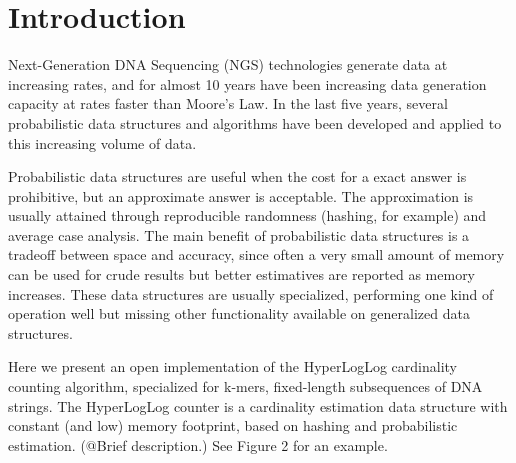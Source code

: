 \documentclass{bioinfo}
\begin{document}

\section{Introduction}

Next-Generation DNA Sequencing (NGS) technologies generate data at
increasing rates, and for almost 10 years have been increasing data
generation capacity at rates faster than Moore's Law.  In the last
five years, several probabilistic data structures and algorithms have
been developed and applied to this increasing volume of data.

Probabilistic data structures are useful when the cost for a exact
answer is prohibitive, but an approximate answer is acceptable.  The
approximation is usually attained through reproducible randomness
(hashing, for example) and average case analysis.  The main benefit of
probabilistic data structures is a tradeoff between space and
accuracy, since often a very small amount of memory can be used for
crude results but better estimatives are reported as memory increases.
These data structures are usually specialized, performing one kind of
operation well but missing other functionality available on
generalized data structures.

Here we present an open implementation of the HyperLogLog cardinality
counting algorithm, specialized for k-mers, fixed-length subsequences
of DNA strings.  The HyperLogLog counter is a cardinality estimation
data structure with constant (and low) memory footprint, based on
hashing and probabilistic estimation.  (@Brief description.) See
Figure 2 for an example.
\end{document}
